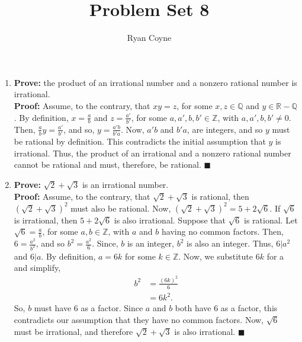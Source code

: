 \documentclass[12pt]{article}
\newcommand{\Z}{\mathbb{Z}}
\newcommand{\R}{\mathbb{R}}
\newcommand{\Q}{\mathbb{Q}}
\newcommand{\qed}{\(\blacksquare\)}
\begin{document}
    \title{Problem Set 8}
    \author{Ryan Coyne}
    \maketitle

    \begin{enumerate}
        \item \textbf{Prove:} the product of an irrational number and a nonzero rational number is irrational.\\ \textbf{Proof:} Assume, to the contrary, that \(xy=z\), for some \(x,z\in\Q\) and \(y\in\R-\Q\). By definition, \(x=\frac{a}{b}\) and \(z=\frac{a'}{b'}\), for some \(a,a',b,b'\in\Z\), with \(a,a',b,b'\neq0\). Then, \(\frac{a}{b}y=\frac{a'}{b'}\), and so, \(y=\frac{a'b}{b'a}\). Now, \(a'b\) and \(b'a\), are integers, and so \(y\) must be rational by definition. This contradicts the initial assumption that \(y\) is irrational. Thus, the product of an irrational and a nonzero rational number cannot be rational and must, therefore, be rational. \qed
        \item \textbf{Prove:}  \(\sqrt{2}+\sqrt{3}\) is an irrational number.\\ \textbf{Proof:} Assume, to the contrary, that \(\sqrt{2}+\sqrt{3}\) is rational, then \((\sqrt{2}+\sqrt{3})^2\) must also be rational. Now, \((\sqrt{2}+\sqrt{3})^2=5+2\sqrt{6}\). If \(\sqrt{6}\) is irrational, then \(5+2\sqrt{6}\) is also irrational. Suppose that \(\sqrt{6}\) is rational. Let \(\sqrt{6}=\frac{a}{b}\), for some \(a,b\in\Z\), with \(a\) and \(b\) having no common factors. Then, \(6=\frac{a^2}{b^2}\), and so \(b^2=\frac{a^2}{6}\). Since, \(b\) is an integer, \(b^2\) is also an integer. Thus, \(6|a^2\) and \(6|a\). By definition, \(a=6k\) for some \(k\in\Z\). Now, we substitute \(6k\) for a and simplify,\begin{equation*}
            \begin{split}
                b^2&=\frac{(6k)^2}{6}\\
                &=6k^2.
            \end{split}
        \end{equation*}
        So, \(b\) must have \(6\) as a factor. Since \(a\) and \(b\) both have \(6\) as a factor, this contradicts our assumption that they have no common factors. Now, \(\sqrt{6}\) must be irrational, and therefore \(\sqrt{2}+\sqrt{3}\) is also irrational. \qed

\end{enumerate}
\end{document}
